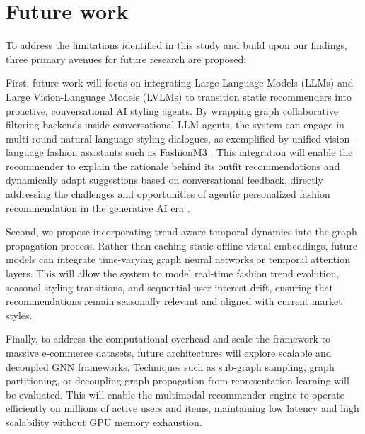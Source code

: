 \section{Future work}

To address the limitations identified in this study and build upon our findings, three primary avenues for future research are proposed:

First, future work will focus on integrating Large Language Models (LLMs) and Large Vision-Language Models (LVLMs) to transition static recommenders into proactive, conversational AI styling agents. By wrapping graph collaborative filtering backends inside conversational LLM agents, the system can engage in multi-round natural language styling dialogues, as exemplified by unified vision-language fashion assistants such as FashionM3 \parencite{pang2025fashionm3multimodalmultitaskmultiround}. This integration will enable the recommender to explain the rationale behind its outfit recommendations and dynamically adapt suggestions based on conversational feedback, directly addressing the challenges and opportunities of agentic personalized fashion recommendation in the generative AI era \parencite{deldjoo2025agenticpersonalizedfashionrecommendation}.

Second, we propose incorporating trend-aware temporal dynamics into the graph propagation process. Rather than caching static offline visual embeddings, future models can integrate time-varying graph neural networks or temporal attention layers. This will allow the system to model real-time fashion trend evolution, seasonal styling transitions, and sequential user interest drift, ensuring that recommendations remain seasonally relevant and aligned with current market styles.

Finally, to address the computational overhead and scale the framework to massive e-commerce datasets, future architectures will explore scalable and decoupled GNN frameworks. Techniques such as sub-graph sampling, graph partitioning, or decoupling graph propagation from representation learning will be evaluated. This will enable the multimodal recommender engine to operate efficiently on millions of active users and items, maintaining low latency and high scalability without GPU memory exhaustion.
